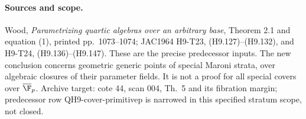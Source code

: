 \paragraph{Sources and scope.}
Wood, \emph{Parametrizing quartic algebras over an arbitrary base},
Theorem 2.1 and equation (1), printed pp.~1073--1074; JAC1964 H9-T23,
(H9.127)--(H9.132), and H9-T24, (H9.136)--(H9.147). These are the
precise predecessor inputs. The new conclusion concerns geometric
generic points of special Maroni strata, over algebraic closures of
their parameter fields. It is not a proof for all special covers over
$\overline{\F}_p$. Archive target: cote 44, scan 004, Th.~5 and its
fibration margin; predecessor row QH9-cover-primitivep is narrowed in
this specified stratum scope, not closed.
